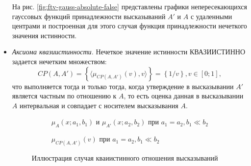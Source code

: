 \begin{itemize}
На рис. \ref{fig:ftv-gauss-absolute-false} представлены графики непересекающихся гауссовых функций принадлежности высказываний $A'$ и $A$ с удаленными центрами и построенная для этого случая функция принадлежности нечеткого значения истинности.

\item \textit{Аксиома квазиистинности.} Нечеткое значение истинности КВАЗИИСТИННО задается нечетким множеством:
\begin{equation*} 
CP(A,A') = \left\{\langle\mu_{CP(A,A')}(v), v\rangle\right\} = \left\{1/v\right\}, v \in [0; 1],
\end{equation*}
что выполняется тогда и только тогда, когда утверждение в высказывании $A'$ является частным по отношению к $A$, то есть оценка данная в высказывании $A$ интервальная и совпадает с носителем высказывания $A$.

\begin{figure}[ht]
	\newcommand{\aOne}{0.5}
	\newcommand{\bOne}{0.05}
	\newcommand{\aTwo}{0.5}
	\newcommand{\bTwo}{0.05}
	\begin{subfigure}[t]{0.5\textwidth}
		\caption{$\mu_A(x; a_1, b_1)$ и $\mu_{A'}(x; a_2, b_2)$ при $a_1 = a_2, b_1 \ll b_2$}
	\end{subfigure}
	\begin{subfigure}[t]{0.5\textwidth}
		\caption{$\mu_{CP(A,A')}(v)$ при $a_1 = a_2, b_1 \ll b_2$}
	\end{subfigure}
	\caption{Иллюстрация случая кваиистинного отношения высказываний}
	\label{fig:ftv-gauss-quazi-true}
\end{figure}


\end{itemize}

